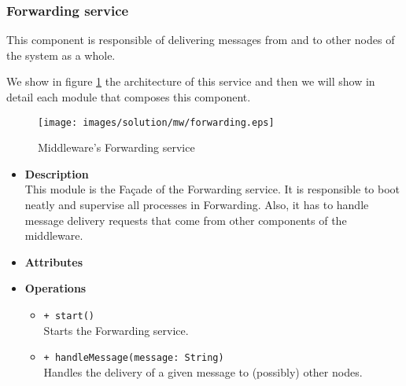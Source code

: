 \subsubsection{Forwarding service}

This component is responsible of delivering messages from and to other nodes of
the system as a whole.

We show in figure \ref{fig:mw-forwarding} the architecture of this service and
then we will show in detail each module that composes this component.

\begin{figure}[H]
  \centering
  \texttt{[image: images/solution/mw/forwarding.eps]}
  \caption{Middleware's Forwarding service}
  \label{fig:mw-forwarding}
\end{figure}

\FloatBarrier
\begin{itemize}
  \item \textbf{Description} \\
    This module is the Fa\c cade of the Forwarding service. It is responsible
    to boot neatly and supervise all processes in Forwarding. Also, it has to
    handle message delivery requests that come from other components of the
    middleware.
  \item \textbf{Attributes}
  \item \textbf{Operations}
  \begin{itemize}
    \item \texttt{+ start()} \\
    Starts the Forwarding service.
    \item \texttt{+ handleMessage(message: String)} \\
    Handles the delivery of a given message to (possibly) other nodes.
  \end{itemize}
\end{itemize}

